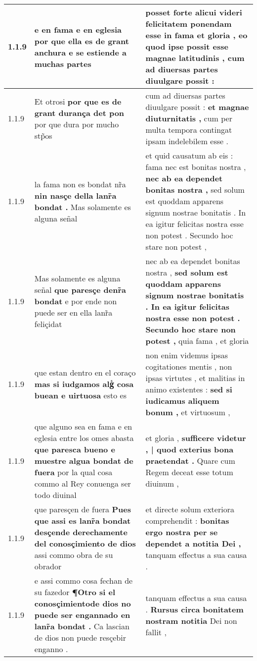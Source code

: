 \begin{tabular}{|p{1cm}|p{6.5cm}|p{6.5cm}|}
1.1.9 & e en fama e en eglesia \textbf{ por que ella es de grant anchura } e se estiende a muchas partes & posset forte alicui videri felicitatem ponendam esse in fama et gloria , \textbf{ eo quod ipse possit esse magnae latitudinis , } cum ad diuersas partes diuulgare possit : \\\hline
1.1.9 & Et otrosi \textbf{ por que es de grant durança det pon } por que dura por mucho stp̃os & cum ad diuersas partes diuulgare possit : \textbf{ et magnae diuturnitatis , } cum per multa tempora contingat ipsam indelebilem esse . \\\hline
1.1.9 & la fama non es bondat nr̃a \textbf{ nin nasçe della lanr̃a bondat . } Mas solamente es alguna señal & et quid causatum ab eis : fama nec est bonitas nostra , \textbf{ nec ab ea dependet bonitas nostra , } sed solum est quoddam apparens signum nostrae bonitatis . In ea igitur felicitas nostra esse non potest . Secundo hoc stare non potest , \\\hline
1.1.9 & Mas solamente es alguna señal \textbf{ que paresçe denr̃a bondat } e por ende non puede ser en ella lanr̃a feliçidat & nec ab ea dependet bonitas nostra , \textbf{ sed solum est quoddam apparens signum nostrae bonitatis . In ea igitur felicitas nostra esse non potest . Secundo hoc stare non potest , } quia fama , et gloria \\\hline
1.1.9 & que estan dentro en el coraço \textbf{ mas si iudgamos algᷤ cosa buean e uirtuosa } esto es & non enim videmus ipsas cogitationes mentis , non ipsas virtutes , et malitias in animo existentes : \textbf{ sed si iudicamus aliquem bonum , } et virtuosum , \\\hline
1.1.9 & que alguno sea en fama e en eglesia entre los omes abasta \textbf{ que paresca bueno e muestre algua bondat de fuera } por la qual cosa commo al Rey conuenga ser todo diuinal & et gloria , \textbf{ sufficere videtur , | quod exterius bona praetendat . } Quare cum Regem deceat esse totum diuinum , \\\hline
1.1.9 & que paresçen de fuera \textbf{ Pues que assi es lanr̃a bondat desçende derechamente del conosçimiento de dios } assi commo obra de su obrador & et directe solum exteriora comprehendit : \textbf{ bonitas ergo nostra per se dependet a notitia Dei , } tanquam effectus a sua causa . \\\hline
1.1.9 & e assi commo cosa fechan de su fazedor \textbf{ ¶Otro si el conosçimientode dios no puede ser engannado en lanr̃a bondat . } Ca lascian de dios non puede resçebir enganno . & tanquam effectus a sua causa . \textbf{ Rursus circa bonitatem nostram notitia } Dei non fallit , \\\hline

\end{tabular}
